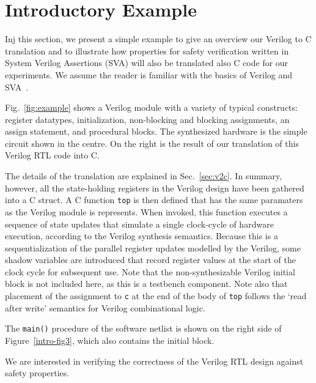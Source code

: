 \section{Introductory Example} 

Inj this section, we present a simple example to give an overview our Verilog to C translation and to illustrate how properties for safety verification written in System Verilog Assertions (SVA) will also be translated also C code for our experiments. We assume the reader is familiar with the basics of Verilog and SVA~\cite{verilog}. 

Fig.~\ref{fig:example} shows a Verilog module with a variety of typical constructs: register datatypes, initialization,
non-blocking and blocking assignments, an assign statement, and procedural blocks.  The synthesized hardware is the simple circuit shown in the centre.  On the right is the result of our translation of this Verilog RTL code into C.

The details of the translation are explained in Sec.~\ref{sec:v2c}. In summary, however, all the state-holding registers
in the Verilog design have been gathered into a C struct. A C function \texttt{top} is then defined that has the same paramaters as the Verilog module is represents. When invoked, this function executes a sequence of state updates that simulate a single clock-cycle of hardware execution, according to the Verilog synthesis semantics. Because this is a sequentialization of the parallel register updates modelled by the Verilog, some shadow variables are introduced that record register values at the start of the clock cycle for subsequent use. Note that the non-synthesizable Verilog initial block is not included here, as this is a testbench component. Note also that placement of the assignment to \texttt{c} at the end of the body of \texttt{top} follows the `read after write' semantics for Verilog combinational logic.

The \texttt{main()} procedure of 
the software netlist is shown on the right side of Figure~\ref{intro-fig3}, 
which also contains the initial block.
%  

We are interested in verifying the correctness of the Verilog RTL design 
against safety properties. 
%

